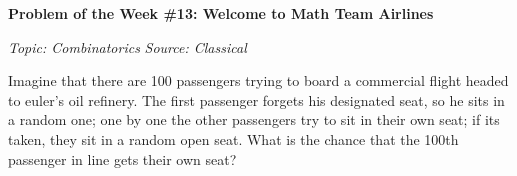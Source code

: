 \begin{potw}\vspace{5pt}
{\large\textbf{Problem of the Week \#13: Welcome to Math Team Airlines}}\vspace{5pt}

\textit{Topic: Combinatorics}\newline
\textit{Source: Classical}\V

Imagine that there are 100 passengers trying to board a commercial flight headed to euler’s oil refinery. The first passenger forgets his designated seat, so he sits in a random one; one by one the other passengers try to sit in their own seat; if its taken, they sit in a random open seat. What is the chance that the 100th passenger in line gets their own seat?
\end{potw}\V
